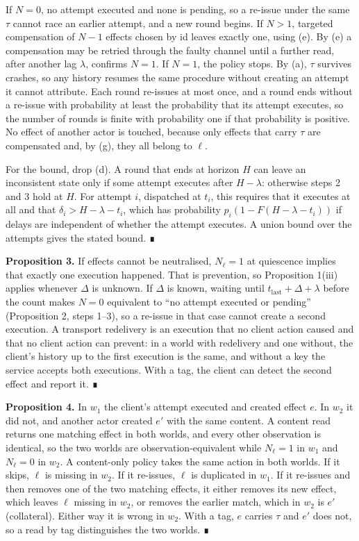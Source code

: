 \documentclass[
  10pt,
]{article}
\begin{document}
If \(N = 0\), no attempt executed and none is pending, so a re-issue
under the same \(\tau\) cannot race an earlier attempt, and a new round
begins. If \(N > 1\), targeted compensation of \(N - 1\) effects chosen
by id leaves exactly one, using (e). By (e) a compensation may be
retried through the faulty channel until a further read, after another
lag \(\lambda\), confirms \(N = 1\). If \(N = 1\), the policy stops. By
(a), \(\tau\) survives crashes, so any history resumes the same
procedure without creating an attempt it cannot attribute. Each round
re-issues at most once, and a round ends without a re-issue with
probability at least the probability that its attempt executes, so the
number of rounds is finite with probability one if that probability is
positive. No effect of another actor is touched, because only effects
that carry \(\tau\) are compensated and, by (g), they all belong to
\(\ell\).

For the bound, drop (d). A round that ends at horizon \(H\) can leave an
inconsistent state only if some attempt executes after \(H - \lambda\):
otherwise steps 2 and 3 hold at \(H\). For attempt \(i\), dispatched at
\(t_i\), this requires that it executes at all and that
\(\delta_i > H - \lambda - t_i\), which has probability
\(p_i(1 - F(H - \lambda - t_i))\) if delays are independent of whether
the attempt executes. A union bound over the attempts gives the stated
bound. ∎

\textbf{Proposition 3.} If effects cannot be neutralised, \(N_\ell = 1\)
at quiescence implies that exactly one execution happened. That is
prevention, so Proposition 1(iii) applies whenever \(\Delta\) is
unknown. If \(\Delta\) is known, waiting until
\(t_{\text{last}} + \Delta + \lambda\) before the count makes \(N = 0\)
equivalent to ``no attempt executed or pending'' (Proposition 2, steps
1--3), so a re-issue in that case cannot create a second execution. A
transport redelivery is an execution that no client action caused and
that no client action can prevent: in a world with redelivery and one
without, the client's history up to the first execution is the same, and
without a key the service accepts both executions. With a tag, the
client can detect the second effect and report it. ∎

\textbf{Proposition 4.} In \(w_1\) the client's attempt executed and
created effect \(e\). In \(w_2\) it did not, and another actor created
\(e'\) with the same content. A content read returns one matching effect
in both worlds, and every other observation is identical, so the two
worlds are observation-equivalent while \(N_\ell = 1\) in \(w_1\) and
\(N_\ell = 0\) in \(w_2\). A content-only policy takes the same action
in both worlds. If it skips, \(\ell\) is missing in \(w_2\). If it
re-issues, \(\ell\) is duplicated in \(w_1\). If it re-issues and then
removes one of the two matching effects, it either removes its new
effect, which leaves \(\ell\) missing in \(w_2\), or removes the earlier
match, which in \(w_2\) is \(e'\) (collateral). Either way it is wrong
in \(w_2\). With a tag, \(e\) carries \(\tau\) and \(e'\) does not, so a
read by tag distinguishes the two worlds. ∎
\end{document}
